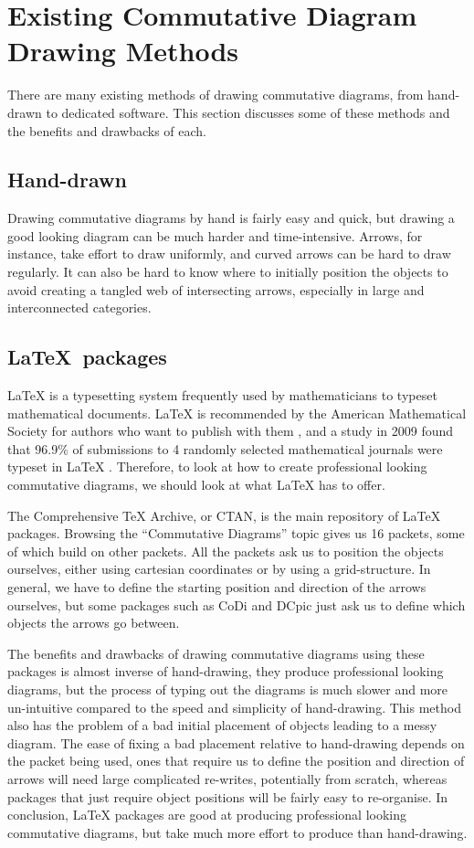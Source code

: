 \documentclass[logo,bsc,singlespacing,parskip]{infthesis}
\theoremstyle{definition}
\begin{document}
\section{Existing Commutative Diagram Drawing Methods}\label{bkg:other}
There are many existing methods of drawing commutative diagrams, from hand-drawn to dedicated software. This section discusses some of these methods and the benefits and drawbacks of each.

\subsection{Hand-drawn}
Drawing commutative diagrams by hand is fairly easy and quick, but drawing a good looking diagram can be much harder and time-intensive. Arrows, for instance, take effort to draw uniformly, and curved arrows can be hard to draw regularly. It can also be hard to know where to initially position the objects to avoid creating a tangled web of intersecting arrows, especially in large and interconnected categories. 

\subsection{\LaTeX\ packages}
\LaTeX{} is a typesetting system frequently used by mathematicians to typeset mathematical documents. \LaTeX{} is recommended by the American Mathematical Society for authors who want to publish with them \cite{AMSlatexrec}, and a study in 2009 found that 96.9\% of submissions to 4 randomly selected mathematical journals were typeset in \LaTeX{} \cite{brischoux2009don}. Therefore, to look at how to create professional looking commutative diagrams, we should look at what \LaTeX{} has to offer.

The Comprehensive \TeX{} Archive, or CTAN, is the main repository of \LaTeX{} packages. Browsing the ``Commutative Diagrams'' topic \cite{ctancommdiag} gives us 16 packets, some of which build on other packets. All the packets ask us to position the objects ourselves, either using cartesian coordinates or by using a grid-structure. %
In general, we have to define the starting position and direction of the arrows ourselves, but some packages such as CoDi \cite{Brasolin_2023} and DCpic \cite{Quaresma_2013} just ask us to define which objects the arrows go between.

The benefits and drawbacks of drawing commutative diagrams using these packages is almost inverse of hand-drawing, they produce professional looking diagrams, but the process of typing out the diagrams is much slower and more un-intuitive compared to the speed and simplicity of hand-drawing. This method also has the problem of a bad initial placement of objects leading to a messy diagram. The ease of fixing a bad placement relative to hand-drawing depends on the packet being used, ones that require us to define the position and direction of arrows will need large complicated re-writes, potentially from scratch, whereas packages that just require object positions will be fairly easy to re-organise. In conclusion, \LaTeX{} packages are good at producing professional looking commutative diagrams, but take much more effort to produce than hand-drawing.
\end{document}
